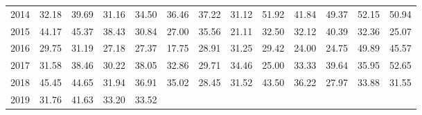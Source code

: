 \begin{longtable}{rrrrrrrrrrrrr}
  2014 & 32.18 & 39.69 & 31.16 & 34.50 & 36.46 & 37.22 & 31.12 & 51.92 & 41.84 & 49.37 & 52.15 & 50.94 \\ 
  2015 & 44.17 & 45.37 & 38.43 & 30.84 & 27.00 & 35.56 & 21.11 & 32.50 & 32.12 & 40.39 & 32.36 & 25.07 \\ 
  2016 & 29.75 & 31.19 & 27.18 & 27.37 & 17.75 & 28.91 & 31.25 & 29.42 & 24.00 & 24.75 & 49.89 & 45.57 \\ 
  2017 & 31.58 & 38.46 & 30.22 & 38.05 & 32.86 & 29.71 & 34.46 & 25.00 & 33.33 & 39.64 & 35.95 & 52.65 \\ 
  2018 & 45.45 & 44.65 & 31.94 & 36.91 & 35.02 & 28.45 & 31.52 & 43.50 & 36.22 & 27.97 & 33.88 & 31.55 \\ 
  2019 & 31.76 & 41.63 & 33.20 & 33.52 &  &  &  &  &  &  &  &  \\ 
   \hline
\hline
\end{longtable}
